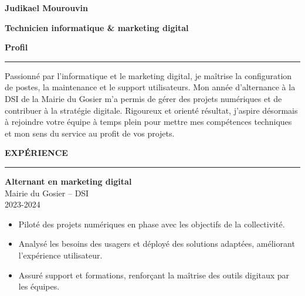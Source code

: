 \documentclass{article}
\newcommand{\cvsection}[1]{%
  \par\bigskip                %
  {\bfseries\Large #1}\par
  \noindent\rule{\linewidth}{0.8pt}\par
  \medskip                    %
}
\newcommand*{\ClipSep}{0.4cm}
\begin{document}
\pagestyle{empty}
\begin{paracol}{2}

\begin{minipage}{0.7\linewidth}
{\LARGE\textbf{Judikael Mourouvin}}

\bigskip
{\large\textbf{Technicien informatique \& marketing digital}}
\end{minipage}\hfill
\begin{minipage}{0.18\linewidth}
\end{minipage}

\cvsection{Profil}
Passionné par l’informatique et le marketing digital, je maîtrise la configuration de postes, la maintenance et le support utilisateurs. Mon année d’alternance à la DSI de la Mairie du Gosier m’a permis de gérer des projets numériques et de contribuer à la stratégie digitale. Rigoureux et orienté résultat, j’aspire désormais à rejoindre votre équipe à temps plein pour mettre mes compétences techniques et mon sens du service au profit de vos projets.

\cvsection{EXPÉRIENCE}

\colorbox{maincolor}{%
  \begin{minipage}{\linewidth}
    \textbf{Alternant en marketing digital} \\ Mairie du Gosier – DSI \\ 2023-2024
    \begin{itemize}
      \item Piloté des projets numériques en phase avec les objectifs de la collectivité. \item Analysé les besoins des usagers et déployé des solutions adaptées, améliorant l’expérience utilisateur. \item Assuré support et formations, renforçant la maîtrise des outils digitaux par les équipes.
    \end{itemize}
  \end{minipage}}

\vspace{3mm}



\end{paracol}
\end{document}
